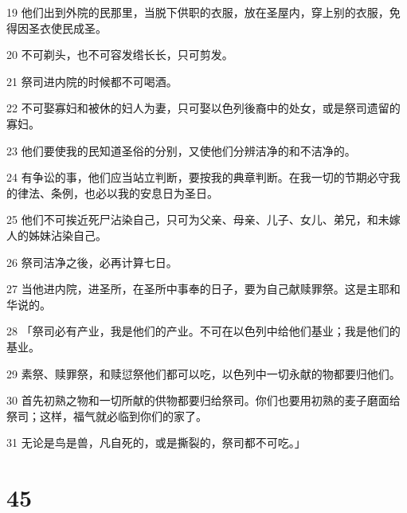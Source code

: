 \par 19 他们出到外院的民那里，当脱下供职的衣服，放在圣屋内，穿上别的衣服，免得因圣衣使民成圣。
\par 20 不可剃头，也不可容发绺长长，只可剪发。
\par 21 祭司进内院的时候都不可喝酒。
\par 22 不可娶寡妇和被休的妇人为妻，只可娶以色列後裔中的处女，或是祭司遗留的寡妇。
\par 23 他们要使我的民知道圣俗的分别，又使他们分辨洁净的和不洁净的。
\par 24 有争讼的事，他们应当站立判断，要按我的典章判断。在我一切的节期必守我的律法、条例，也必以我的安息日为圣日。
\par 25 他们不可挨近死尸沾染自己，只可为父亲、母亲、儿子、女儿、弟兄，和未嫁人的姊妹沾染自己。
\par 26 祭司洁净之後，必再计算七日。
\par 27 当他进内院，进圣所，在圣所中事奉的日子，要为自己献赎罪祭。这是主耶和华说的。
\par 28 「祭司必有产业，我是他们的产业。不可在以色列中给他们基业；我是他们的基业。
\par 29 素祭、赎罪祭，和赎愆祭他们都可以吃，以色列中一切永献的物都要归他们。
\par 30 首先初熟之物和一切所献的供物都要归给祭司。你们也要用初熟的麦子磨面给祭司；这样，福气就必临到你们的家了。
\par 31 无论是鸟是兽，凡自死的，或是撕裂的，祭司都不可吃。」

\chapter{45}

